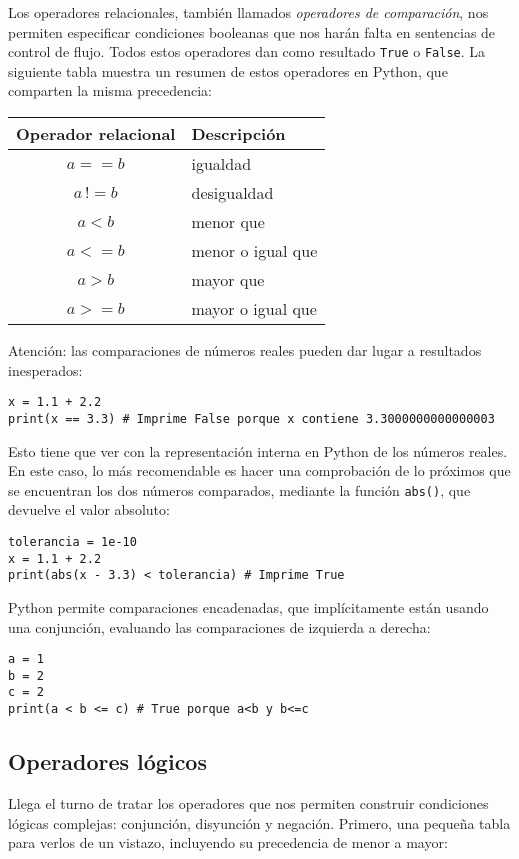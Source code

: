 Los operadores relacionales, también llamados \emph{operadores de comparación}, nos permiten especificar condiciones booleanas que nos harán falta en sentencias de control de flujo. Todos estos operadores dan como resultado \texttt{True} o \texttt{False}. La siguiente tabla muestra un resumen de estos operadores en Python, que comparten la misma precedencia:

\begin{tabular}{c|l}
	Operador relacional & Descripción\\
	\hline\hline
	$a == b$ & igualdad\\
	$a\, !\!= b$ & desigualdad\\
	$a < b$ & menor que\\
	$a <= b$ & menor o igual que\\
	$a > b$ & mayor que\\
	$a >= b$ & mayor o igual que
\end{tabular}

Atención: las comparaciones de números reales pueden dar lugar a resultados inesperados:

\begin{lstlisting}
x = 1.1 + 2.2
print(x == 3.3) # Imprime False porque x contiene 3.3000000000000003
\end{lstlisting}

Esto tiene que ver con la representación interna en Python de los números reales. En este caso, lo más recomendable es hacer una comprobación de lo próximos que se encuentran los dos números comparados, mediante la función \texttt{abs()}, que devuelve el valor absoluto:

\begin{lstlisting}
tolerancia = 1e-10
x = 1.1 + 2.2
print(abs(x - 3.3) < tolerancia) # Imprime True
\end{lstlisting}

Python permite comparaciones encadenadas, que implícitamente están usando una conjunción, evaluando las comparaciones de izquierda a derecha:

\begin{lstlisting}
a = 1
b = 2
c = 2
print(a < b <= c) # True porque a<b y b<=c
\end{lstlisting}

\subsection{Operadores lógicos}

Llega el turno de tratar los operadores que nos permiten construir condiciones lógicas complejas: conjunción, disyunción y negación. Primero, una pequeña tabla para verlos de un vistazo, incluyendo su precedencia de menor a mayor:

